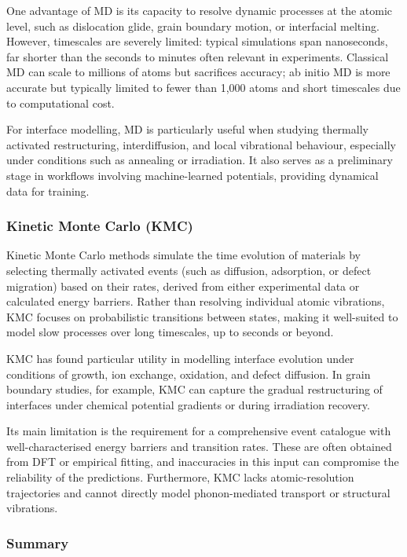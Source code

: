  
One advantage of MD is its capacity to resolve dynamic processes at the atomic level, such as dislocation glide, grain boundary motion, or interfacial melting. However, timescales are severely limited: typical simulations span nanoseconds, far shorter than the seconds to minutes often relevant in experiments. Classical MD can scale to millions of atoms but sacrifices accuracy; ab initio MD is more accurate but typically limited to fewer than 1,000 atoms and short timescales due to computational cost. 
 
 
For interface modelling, MD is particularly useful when studying thermally activated restructuring, interdiffusion, and local vibrational behaviour, especially under conditions such as annealing or irradiation. It also serves as a preliminary stage in workflows involving machine-learned potentials, providing dynamical data for training. 
 
\subsubsection{Kinetic Monte Carlo (KMC)} 
 
Kinetic Monte Carlo methods simulate the time evolution of materials by selecting thermally activated events (such as diffusion, adsorption, or defect migration) based on their rates, derived from either experimental data or calculated energy barriers. Rather than resolving individual atomic vibrations, KMC focuses on probabilistic transitions between states, making it well-suited to model slow processes over long timescales, up to seconds or beyond. 
 
KMC has found particular utility in modelling interface evolution under conditions of growth, ion exchange, oxidation, and defect diffusion. In grain boundary studies, for example, KMC can capture the gradual restructuring of interfaces under chemical potential gradients or during irradiation recovery. 
 
Its main limitation is the requirement for a comprehensive event catalogue with well-characterised energy barriers and transition rates. These are often obtained from DFT or empirical fitting, and inaccuracies in this input can compromise the reliability of the predictions. Furthermore, KMC lacks atomic-resolution trajectories and cannot directly model phonon-mediated transport or structural vibrations. 
 
\subsubsection{Summary} 
 
